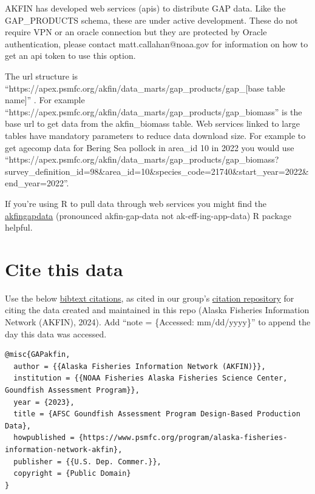 \documentclass[
  letterpaper,
  oneside,
  open=any]{scrbook}
\begin{document}

AKFIN has developed web services (apis) to distribute GAP data. Like the
GAP\_PRODUCTS schema, these are under active development. These do not
require VPN or an oracle connection but they are protected by Oracle
authentication, please contact matt.callahan@noaa.gov for information on
how to get an api token to use this option.

The url structure is
``https://apex.psmfc.org/akfin/data\_marts/gap\_products/gap\_{[}base
table name{]}'' . For example
``https://apex.psmfc.org/akfin/data\_marts/gap\_products/gap\_biomass''
is the base url to get data from the akfin\_biomass table. Web services
linked to large tables have mandatory parameters to reduce data download
size. For example to get agecomp data for Bering Sea pollock in area\_id
10 in 2022 you would use
``https://apex.psmfc.org/akfin/data\_marts/gap\_products/gap\_biomass?survey\_definition\_id=98\&area\_id=10\&species\_code=21740\&start\_year=2022\&end\_year=2022''.

If you're using R to pull data through web services you might find the
\href{https://github.com/MattCallahan-NOAA/akfingapdata/tree/main}{akfingapdata}
(pronounced akfin-gap-data not ak-eff-ing-app-data) R package helpful.

\hypertarget{cite-this-data-2}{%
\section*{Cite this data}\label{cite-this-data-2}}


Use the below
\href{https://github.com/afsc-gap-products/gap_products/blob/main/code/CITATION_GAPakfin.bib}{bibtext
citations}, as cited in our group's
\href{https://github.com/afsc-gap-products/citations/blob/main/cite/bibliography.bib}{citation
repository} for citing the data created and maintained in this repo
(Alaska Fisheries Information Network (AKFIN), 2024). Add ``note =
\{Accessed: mm/dd/yyyy\}'' to append the day this data was accessed.

\begin{verbatim}
@misc{GAPakfin,
  author = {{Alaska Fisheries Information Network (AKFIN)}}, 
  institution = {{NOAA Fisheries Alaska Fisheries Science Center, Goundfish Assessment Program}},
  year = {2023}, 
  title = {AFSC Goundfish Assessment Program Design-Based Production Data},
  howpublished = {https://www.psmfc.org/program/alaska-fisheries-information-network-akfin},
  publisher = {{U.S. Dep. Commer.}},
  copyright = {Public Domain} 
}
\end{verbatim}
\end{document}
